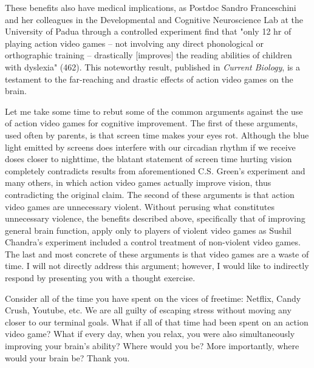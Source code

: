 \documentclass[12pt]{article}
\begin{document}
\begin{flushleft}
These benefits also have medical implications, as Postdoc Sandro Franceschini and her colleagues in the Developmental and Cognitive Neuroscience Lab at the University of Padua through a controlled experiment find that "only 12 hr of playing action video games -- not involving any direct phonological or orthographic training -- drastically [improves] the reading abilities of children with dyslexia" (462). This noteworthy result, published in \emph{Current Biology}, is a testament to the far-reaching and drastic effects of action video games on the brain.

Let me take some time to rebut some of the common arguments against the use of action video games for cognitive improvement. The first of these arguments, used often by parents, is that screen time makes your eyes rot. Although the blue light emitted by screens does interfere with our circadian rhythm if we receive doses closer to nighttime, the blatant statement of screen time hurting vision completely contradicts results from aforementioned C.S. Green's experiment and many others, in which action video games actually improve vision, thus contradicting the original claim. The second of these arguments is that action video games are unnecessary violent. Without perusing what constitutes unnecessary violence, the benefits described above, specifically that of improving general brain function, apply only to players of violent video games as Sushil Chandra's experiment included a control treatment of non-violent video games. The last and most concrete of these arguments is that video games are a waste of time. I will not directly address this argument; however, I would like to indirectly respond by presenting you with a thought exercise.

Consider all of the time you have spent on the vices of freetime: Netflix, Candy Crush, Youtube, etc. We are all guilty of escaping stress without moving any closer to our terminal goals. What if all of that time had been spent on an action video game? What if every day, when you relax, you were also simultaneously improving your brain's ability? Where would you be? More importantly, where would your brain be? Thank you.
\end{flushleft}
\end{document}
